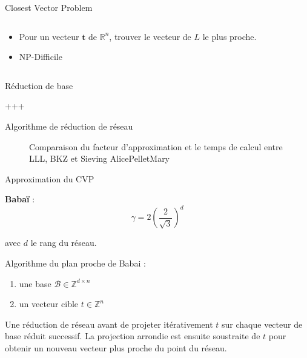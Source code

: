 \documentclass{backend/backend}
\begin{document}
\begin{frame}{Closest Vector Problem}

\begin{columns}

    \begin{column}{0.5 \linewidth}
        \begin{itemize}
            \item Pour un vecteur $\mathbf{t}$ de $\mathbb{R}^n$, trouver le vecteur de $L$ le plus proche.
            \item NP-Difficile
        \end{itemize}
    \end{column}

\end{columns}
\end{frame}


\begin{frame}{Réduction de base}

+++
    
\end{frame}


\begin{frame}{Algorithme de réduction de réseau}
    \begin{figure}
        \centering
        \caption{Comparaison du facteur d'approximation et le temps de calcul entre LLL, BKZ et Sieving AlicePelletMary}
        \label{fig:algoReduc}
    \end{figure}
\end{frame}


\begin{frame}{Approximation du CVP}

    \Large{ \textbf{Babaï}} \normalsize :\\
    
    $$ \gamma = 2\left(\frac{2}{\sqrt{3}}\right)^d $$

    avec $d$ le rang du réseau.\smallbreak

    Algorithme du plan proche de Babai :
    \begin{enumerate}
        \item une base \(\mathcal{B} \in \mathbb{Z}^{d \times n}\)
        \item un vecteur cible \(t \in \mathbb{Z}^n\)
    \end{enumerate}
    Une réduction de réseau avant de projeter itérativement \(t\) sur chaque vecteur de base réduit successif. La projection arrondie est ensuite soustraite de \(t\) pour obtenir un nouveau vecteur plus proche du point du réseau.
    
\end{frame}
\end{document}
